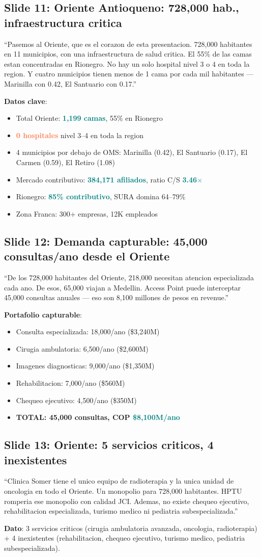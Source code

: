 \documentclass[10pt, a4paper]{article}
\newcommand{\hl}[1]{\textcolor{teal}{\textbf{#1}}}
\newcommand{\dg}[1]{\textcolor{coral}{\textbf{#1}}}
\newcommand{\slide}[2]{\subsection{Slide #1: #2}}
\begin{document}
\slide{11}{Oriente Antioqueno: 728,000 hab., infraestructura critica}
\begin{tip}
``Pasemos al Oriente, que es el corazon de esta presentacion. 728,000 habitantes en 11 municipios, con una infraestructura de salud critica. El 55\% de las camas estan concentradas en Rionegro. No hay un solo hospital nivel 3 o 4 en toda la region. Y cuatro municipios tienen menos de 1 cama por cada mil habitantes --- Marinilla con 0.42, El Santuario con 0.17.''
\end{tip}
\textbf{Datos clave}:
\begin{itemize}[nosep]
  \item Total Oriente: \hl{1,199 camas}, 55\% en Rionegro
  \item \dg{0 hospitales} nivel 3--4 en toda la region
  \item 4 municipios por debajo de OMS: Marinilla (0.42), El Santuario (0.17), El Carmen (0.59), El Retiro (1.08)
  \item Mercado contributivo: \hl{384,171 afiliados}, ratio C/S \hl{3.46$\times$}
  \item Rionegro: \hl{85\% contributivo}, SURA domina 64--79\%
  \item Zona Franca: 300+ empresas, 12K empleados
\end{itemize}

\slide{12}{Demanda capturable: 45,000 consultas/ano desde el Oriente}
\begin{tip}
``De los 728,000 habitantes del Oriente, 218,000 necesitan atencion especializada cada ano. De esos, 65,000 viajan a Medellin. Access Point puede interceptar 45,000 consultas anuales --- eso son 8,100 millones de pesos en revenue.''
\end{tip}
\textbf{Portafolio capturable}:
\begin{itemize}[nosep]
  \item Consulta especializada: 18,000/ano (\$3,240M)
  \item Cirugia ambulatoria: 6,500/ano (\$2,600M)
  \item Imagenes diagnosticas: 9,000/ano (\$1,350M)
  \item Rehabilitacion: 7,000/ano (\$560M)
  \item Chequeo ejecutivo: 4,500/ano (\$350M)
  \item \textbf{TOTAL: 45,000 consultas, COP \hl{\$8,100M/ano}}
\end{itemize}

\slide{13}{Oriente: 5 servicios criticos, 4 inexistentes}
\begin{tip}
``Clinica Somer tiene el unico equipo de radioterapia y la unica unidad de oncologia en todo el Oriente. Un monopolio para 728,000 habitantes. HPTU romperia ese monopolio con calidad JCI. Ademas, no existe chequeo ejecutivo, rehabilitacion especializada, turismo medico ni pediatria subespecializada.''
\end{tip}
\textbf{Dato}: 3 servicios criticos (cirugia ambulatoria avanzada, oncologia, radioterapia) + 4 inexistentes (rehabilitacion, chequeo ejecutivo, turismo medico, pediatria subespecializada).
\end{document}
